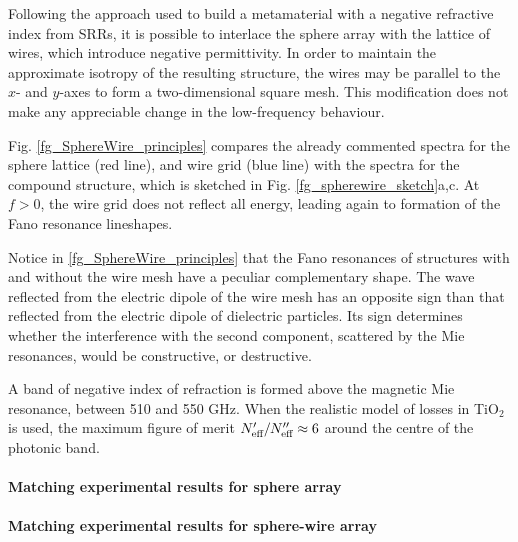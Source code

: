 Following the approach used to build a metamaterial with a negative refractive index from SRRs, it is possible to interlace the sphere array with the lattice of wires, which introduce negative permittivity. In order to maintain the approximate isotropy of the resulting structure, the wires may be parallel to the $x$- and $y$-axes to form a two-dimensional square mesh. This modification does not make any appreciable change in the low-frequency behaviour. %

Fig. \ref{fg_SphereWire_principles} compares the already commented spectra for the sphere lattice (red line), and wire grid (blue line) with the spectra for the compound structure, which is sketched in Fig. \ref{fg_spherewire_sketch}a,c. At $f>0$, the wire grid does not reflect all energy, leading again to formation of the Fano resonance lineshapes. 

Notice in \ref{fg_SphereWire_principles} that the Fano resonances of structures with and without the wire mesh have a peculiar complementary shape. The wave reflected from the electric dipole of the wire mesh has an opposite sign than that reflected from the electric dipole of dielectric particles. Its sign determines whether the interference with the second component, scattered by the Mie resonances, would be constructive, or destructive. 

A band of negative index of refraction is formed above the magnetic Mie resonance, between 510 and 550 GHz. When the realistic model of losses in TiO$_2$ is used, the maximum figure of merit $N_{\text{eff} }'/N_{\text{eff} }'' \approx 6$ around the centre of the photonic band.


\paragraph{Matching experimental results for sphere array} %
\paragraph{Matching experimental results for sphere-wire array} %


